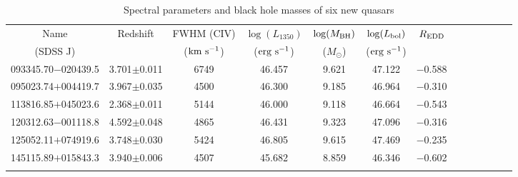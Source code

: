 \documentclass[referee]{raa}
\begin{document}
\begin{table}
\bc
\begin{minipage}[]{100mm}
\caption[]{Spectral parameters and black hole masses of six new quasars\label{tab2}}\end{minipage}
\setlength{\tabcolsep}{2.5pt}
\small
 \begin{tabular}{ccccccccccccc}
  \hline\noalign{\smallskip}
Name &  Redshift & FWHM (CIV) & $\log (L_{1350})$ & $\log (M_{\rm BH})$ &
$\log (L_{\rm bol})$ & $R_{\rm EDD}$ \\
 (SDSS J)&  & ($\rm km~s^{-1}$) & ($\rm erg~s^{-1}$) &($M_\odot$) &($\rm erg~s^{-1}$) &  \\
  \hline\noalign{\smallskip}
093345.70$-$020439.5& 3.701$\pm$0.011 &  6749 &  46.457&  9.621&   47.122  &
  $-$0.588  \\
095023.74$+$004419.7& 3.967$\pm$0.035 &  4500 &  46.300&  9.185&   46.964  &
  $-$0.310  \\
113816.85$+$045023.6& 2.368$\pm$0.011 &  5144 &  46.000&  9.118&   46.664  &
  $-$0.543  \\
120312.63$-$001118.8& 4.592$\pm$0.048 &  4865 &  46.431&  9.323&    47.096  &
  $-$0.316  \\
125052.11$+$074919.6& 3.748$\pm$0.030 &  5424 &  46.805&  9.615&   47.469  &
  $-$0.235  \\
145115.89$+$015843.3& 3.940$\pm$0.006 &  4507 &  45.682&  8.859&   46.346  &
  $-$0.602  \\
  \noalign{\smallskip}\hline
\end{tabular}
\ec
\end{table}
\end{document}
